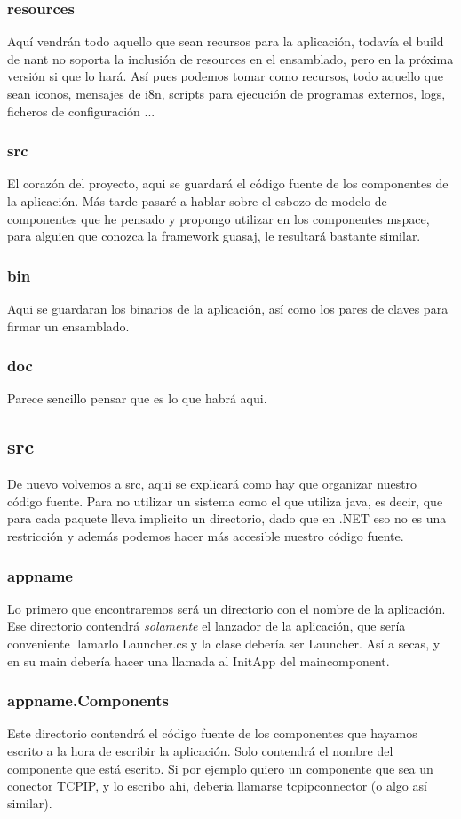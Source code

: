 \documentclass[a4paper]{article}
\begin{document}
\subsubsection{resources}
Aquí vendrán todo aquello que sean recursos para la aplicación, todavía el build
de nant no soporta la inclusión de resources en el ensamblado, pero en la
próxima versión si que lo hará.
Así pues podemos tomar como recursos, todo aquello que sean iconos, mensajes de
i8n, scripts para ejecución de programas externos, logs, ficheros de
configuración ...
\subsubsection{src}
El corazón del proyecto, aqui se guardará el código fuente de los componentes de
la aplicación.  Más tarde pasaré a hablar sobre el esbozo de modelo de
componentes que he pensado y propongo utilizar en los componentes mspace, para
alguien que conozca la framework guasaj, le resultará bastante similar.
\subsubsection{bin}
Aqui se guardaran los binarios de la aplicación, así como los pares de claves
para firmar un ensamblado.
\subsubsection{doc}
Parece sencillo pensar que es lo que habrá aqui.
\subsection{src}
De nuevo volvemos a src, aqui se explicará como hay que organizar nuestro código
fuente.
Para no utilizar un sistema como el que utiliza java, es decir, que para cada
paquete lleva implicito un directorio, dado que en .NET eso no es una
restricción y además podemos hacer más accesible nuestro código fuente.
\subsubsection{appname}
Lo primero que encontraremos será un directorio con el nombre de la aplicación.
Ese directorio contendrá \emph{solamente} el lanzador de la aplicación, que
sería conveniente llamarlo Launcher.cs y la clase debería ser Launcher. Así a
secas, y en su main debería hacer una llamada al InitApp del maincomponent.
\subsubsection{appname.Components}
Este directorio contendrá el código fuente de los componentes que hayamos
escrito a la hora de escribir la aplicación.  Solo contendrá el nombre del
componente que está escrito.  Si por ejemplo quiero un componente que sea un
conector TCPIP, y lo escribo ahi, deberia llamarse tcpipconnector (o algo así
similar).
\end{document}
